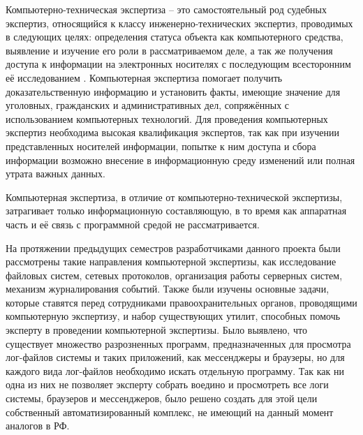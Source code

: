 Компьютерно-техническая экспертиза – это самостоятельный род судебных экспертиз, относящийся к классу инженерно-технических экспертиз, проводимых в следующих целях: определения статуса объекта как компьютерного средства, выявление и изучение его роли в рассматриваемом деле, а так же получения доступа к информации на электронных носителях с последующим всесторонним её исследованием \cite{fedotovforenzika}.
Компьютерная экспертиза помогает получить доказательственную информацию и установить факты, имеющие значение для уголовных, гражданских и административных дел, сопряжённых с использованием компьютерных технологий. Для проведения компьютерных экспертиз необходима высокая квалификация экспертов, так как при изучении представленных носителей информации, попытке к ним доступа и сбора информации возможно внесение в информационную среду изменений или полная утрата важных данных.

Компьютерная экспертиза, в отличие от компьютерно-технической экспертизы, затрагивает только информационную составляющую, в то время как аппаратная часть и её связь с программной средой не рассматривается.

На протяжении предыдущих семестров разработчиками данного проекта были рассмотрены такие направления компьютерной экспертизы, как исследование файловых систем, сетевых протоколов, организация работы серверных систем, механизм журналирования событий. Также были изучены основные задачи, которые ставятся перед сотрудниками правоохранительных органов, проводящими компьютерную экспертизу, и набор существующих утилит, способных помочь эксперту в проведении компьютерной экспертизы. Было выявлено, что существует множество разрозненных программ, предназначенных для просмотра лог-файлов системы и таких приложений, как мессенджеры и браузеры, но для каждого вида лог-файлов необходимо искать отдельную программу. Так как ни одна из них не позволяет эксперту собрать воедино и просмотреть все логи системы, браузеров и мессенджеров, было решено создать для этой цели собственный автоматизированный комплекс, не имеющий на данный момент аналогов в РФ.
